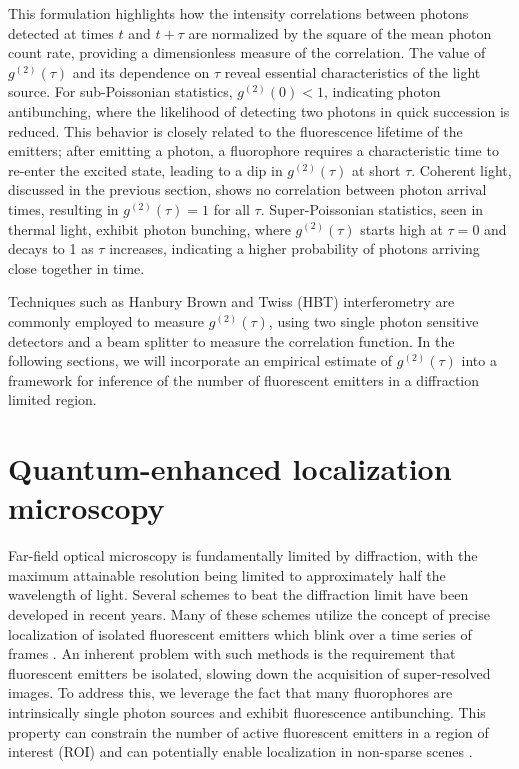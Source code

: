 This formulation highlights how the intensity correlations between photons detected at times $ t $ and $ t+\tau $ are normalized by the square of the mean photon count rate, providing a dimensionless measure of the correlation. The value of $ g^{(2)}(\tau) $ and its dependence on $ \tau $ reveal essential characteristics of the light source. For sub-Poissonian statistics, $ g^{(2)}(0) < 1$, indicating photon antibunching, where the likelihood of detecting two photons in quick succession is reduced. This behavior is closely related to the fluorescence lifetime of the emitters; after emitting a photon, a fluorophore requires a characteristic time to re-enter the excited state, leading to a dip in $ g^{(2)}(\tau) $ at short $ \tau $. Coherent light, discussed in the previous section, shows no correlation between photon arrival times, resulting in $ g^{(2)}(\tau) = 1 $ for all $ \tau $. Super-Poissonian statistics, seen in thermal light, exhibit photon bunching, where $ g^{(2)}(\tau) $ starts high at $ \tau = 0 $ and decays to 1 as $ \tau $ increases, indicating a higher probability of photons arriving close together in time.

Techniques such as Hanbury Brown and Twiss (HBT) interferometry are commonly employed to measure $ g^{(2)}(\tau) $, using two single photon sensitive detectors and a beam splitter to measure the correlation function. In the following sections, we will incorporate an empirical estimate of $g^{(2)}(\tau)$ into a framework for inference of the number of fluorescent emitters in a diffraction limited region. 

\section{Quantum-enhanced localization microscopy}

Far-field optical microscopy is fundamentally limited by diffraction, with the maximum attainable resolution being limited to approximately half the wavelength of light. Several schemes to beat the diffraction limit have been developed in recent years. Many of these schemes utilize the concept of precise localization of isolated fluorescent emitters which blink over a time series of frames \parencite{Rust2006,Betzig2006}. An inherent problem with such methods is the requirement that fluorescent emitters be isolated, slowing down the acquisition of super-resolved images. To address this, we leverage the fact that many fluorophores are intrinsically single photon sources and exhibit fluorescence antibunching. This property can constrain the number of active fluorescent emitters in a region of interest (ROI) and can potentially enable localization in non-sparse scenes \parencite{Ta2010,Israel2017}. 

